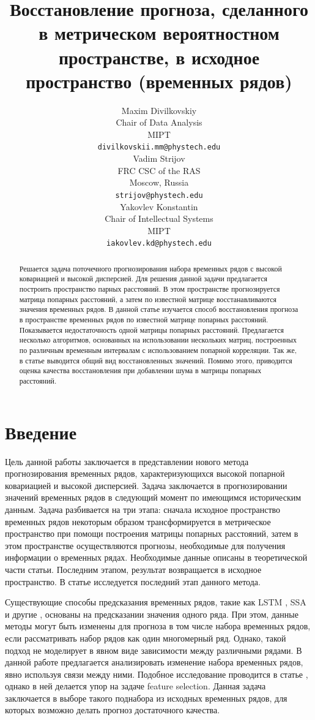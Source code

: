 \documentclass{article}
\title{Восстановление прогноза, сделанного в метрическом вероятностном пространстве, в исходное пространство (временных рядов)}
\author{ Maxim Divilkovskiy \\
	Chair of Data Analysis\\
	MIPT\\
	\texttt{divilkovskii.mm@phystech.edu} \\
	\And
	Vadim Strijov \\
	FRC CSC of the RAS\\
	Moscow, Russia\\
    \texttt{strijov@phystech.edu} \\
    \And
    Yakovlev Konstantin \\
    Chair of Intellectual Systems\\
    MIPT\\
    \texttt{iakovlev.kd@phystech.edu} \\
}
\date{}
\begin{document}
\maketitle

\begin{abstract}
	Решается задача поточечного прогнозирования набора временных рядов с высокой ковариацией и высокой дисперсией. Для решения данной задачи предлагается построить пространство парных расстояний. В этом пространстве прогнозируется матрица попарных расстояний, а затем по известной матрице восстанавливаются значения временных рядов.
	В данной статье изучается способ восстановления прогноза в пространстве временных рядов по известной матрице попарных расстояний. Показывается недостаточность одной матрицы попарных расстояний. Предлагается несколько алгоритмов, основанных на использовании нескольких матриц, построенных по различным временным интервалам с использованием попарной корреляции. Так же, в статье выводится общий вид восстановленных значений. Помимо этого, приводится оценка качества восстановления при добавлении шума в матрицы попарных расстояний.


\end{abstract}



\section{Введение}
	Цель данной работы заключается в представлении нового метода прогнозирования временных рядов, характеризующихся высокой попарной ковариацией и высокой дисперсией. Задача заключается в прогнозировании значений временных рядов в следующий момент по имеющимся историческим данным. Задача разбивается на три этапа: сначала исходное пространство временных рядов некоторым образом трансформируется в метрическое пространство при помощи построения матрицы попарных расстояний, затем в этом пространстве осуществляются прогнозы, необходимые для получения информации о временных рядах. Необходимые данные описаны в теоретической части статьи. Последним этапом, результат возвращается в исходное пространство. В статье исследуется последний этап данного метода.
		
	Существующие способы предсказания временных рядов, такие как LSTM \cite{LSTM}, SSA \cite{SSA} и другие \cite{Biosignals}, \cite{boyd2017multiperiod} основаны на предсказании значения одного ряда. При этом, данные методы могут быть изменены для прогноза в том числе набора временных рядов, если рассматривать набор рядов как один многомерный ряд. Однако, такой подход не моделирует в явном виде зависимости между различными рядами. В данной работе предлагается анализировать изменение набора временных рядов, явно используя связи между ними. Подобное исследование проводится в статье \cite{MulticorrelatedQuadratic}, однако в ней делается упор на задаче feature selection. Данная задача заключается в выборе такого поднабора из исходных временных рядов, для которых возможно делать прогноз достаточного качества.
	
\end{document}
